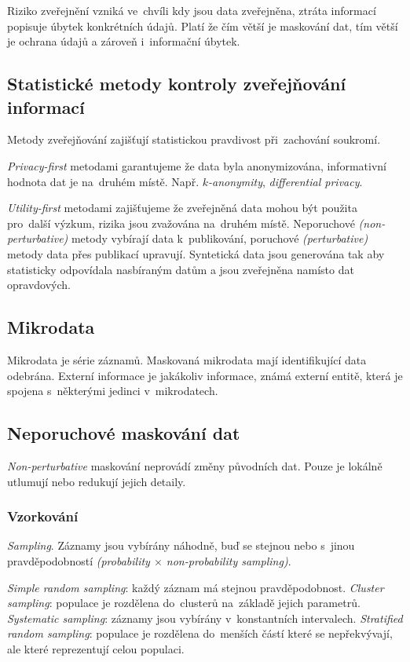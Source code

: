 Riziko zveřejnění vzniká ve~chvíli kdy jsou data zveřejněna, ztráta informací popisuje úbytek konkrétních údajů.
Platí že čím větší je maskování dat, tím větší je ochrana údajů a zároveň i~informační úbytek.


\subsection{Statistické metody kontroly zveřejňování informací}

Metody zveřejňování zajišťují statistickou pravdivost při~zachování soukromí.

\emph{Privacy-first} metodami garantujeme že data byla anonymizována, informativní hodnota dat je na~druhém místě.
Např. \emph{$k$-anonymity}, \emph{differential privacy}.

\emph{Utility-first} metodami zajišťujeme že zveřejněná data mohou být použita pro~další výzkum, rizika jsou zvažována na~druhém místě.
Neporuchové \emph{(non-perturbative)} metody vybírají data k~publikování, poruchové \emph{(perturbative)} metody data přes publikací upravují.
Syntetická data jsou generována tak aby statisticky odpovídala nasbíraným datům a jsou zveřejněna namísto dat opravdových.


\subsection{Mikrodata}

Mikrodata je série záznamů.
Maskovaná mikrodata mají identifikující data odebrána.
Externí informace je jakákoliv informace, známá externí entitě, která je spojena s~některými jedinci v~mikrodatech.


\subsection{Neporuchové maskování dat}

\emph{Non-perturbative} maskování neprovádí změny původních dat.
Pouze je lokálně utlumují nebo redukují jejich detaily.


\subsubsection*{Vzorkování}

\emph{Sampling}.
Záznamy jsou vybírány náhodně, buď se stejnou nebo s~jinou pravděpodobností \emph{(probability $\times$ non-probability sampling)}.

\emph{Simple random sampling}: každý záznam má stejnou pravděpodobnost.
\emph{Cluster sampling}: populace je rozdělena do~clusterů na~základě jejich parametrů.
\emph{Systematic sampling}: záznamy jsou vybírány v~konstantních intervalech.
\emph{Stratified random sampling}: populace je rozdělena do~menších částí které se nepřekvývají, ale které reprezentují celou populaci.


